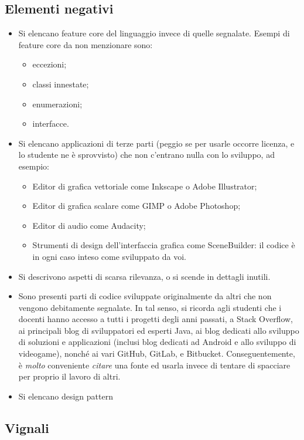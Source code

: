 \documentclass[a4paper,12pt]{report}
\begin{document}
\subsection*{Elementi negativi}
\begin{itemize}
	\item Si elencano feature core del linguaggio invece di quelle segnalate. Esempi di feature core da non menzionare sono:
    \begin{itemize}
        \item eccezioni;
        \item classi innestate;
        \item enumerazioni;
        \item interfacce.
    \end{itemize}
	\item Si elencano applicazioni di terze parti (peggio se per usarle occorre licenza, e lo studente ne è sprovvisto) che non c'entrano nulla con lo sviluppo, ad esempio:
    \begin{itemize}
        \item Editor di grafica vettoriale come Inkscape o Adobe Illustrator;
        \item Editor di grafica scalare come GIMP o Adobe Photoshop;
        \item Editor di audio come Audacity;
        \item Strumenti di design dell'interfaccia grafica come SceneBuilder: il codice è in ogni caso inteso come sviluppato da voi.
    \end{itemize}
	\item Si descrivono aspetti di scarsa rilevanza, o si scende in dettagli inutili.
	\item Sono presenti parti di codice sviluppate originalmente da altri che non vengono debitamente segnalate.
	In tal senso, si ricorda agli studenti che i docenti hanno accesso a tutti i progetti degli anni passati,
	a Stack Overflow,
	ai principali blog di sviluppatori ed esperti Java,
	ai blog dedicati allo sviluppo di soluzioni e applicazioni
	(inclusi blog dedicati ad Android e allo sviluppo di videogame),
	nonché ai vari GitHub, GitLab, e Bitbucket.
	Conseguentemente, è \emph{molto} conveniente \emph{citare} una fonte ed usarla invece di tentare di spacciare per proprio il lavoro di altri.
	\item Si elencano design pattern
\end{itemize}

\subsection{Vignali}
\end{document}
